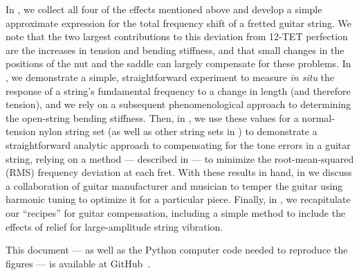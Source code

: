 In , we collect all four of the effects mentioned above and develop a simple approximate expression for the total frequency shift of a fretted guitar string. We note that the two largest contributions to this deviation from 12-TET perfection are the increases in tension and bending stiffness, and that small changes in the positions of the nut and the saddle can largely compensate for these problems. In , we demonstrate a simple, straightforward experiment to measure \emph{in situ} the response of a string's fundamental frequency to a change in length (and therefore tension), and we rely on a subsequent phenomenological approach to determining the open-string bending stiffness. Then, in , we use these values for a normal-tension nylon string set (as well as other string sets in ) to demonstrate a straightforward analytic approach to compensating for the tone errors in a guitar string, relying on a method --- described in  --- to minimize the root-mean-squared (RMS) frequency deviation at each fret. With these results in hand, in  we discuss a collaboration of guitar manufacturer and musician to temper the guitar using harmonic tuning to optimize it for a particular piece. Finally, in , we recapitulate our ``recipes'' for guitar compensation, including a simple method to include the effects of relief for large-amplitude string vibration.

This document --- as well as the Python computer code needed to reproduce the figures --- is available at GitHub~\cite{ref:github2024rgb}. 